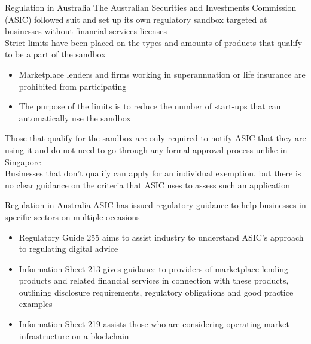\documentclass[10pt]{beamer}
\begin{document}

\begin{frame}{Regulation in Australia}
	The Australian Securities and Investments Commission (ASIC) followed suit and set up its own regulatory sandbox targeted at businesses without financial services licenses \\ \vspace{3mm}
	Strict limits have been placed on the types and amounts of products that qualify to be a part of the sandbox
	\begin{itemize}
		\item Marketplace lenders and firms working in superannuation or life insurance are prohibited from participating
		\item The purpose of the limits is to reduce the number of start-ups that can automatically use the sandbox
	\end{itemize}
	Those that qualify for the sandbox are only required to notify ASIC that they are using it and do not need to go through any formal approval process unlike in Singapore \\ \vspace{3mm}
	Businesses that don't qualify can apply for an individual exemption, but there is no clear guidance on the criteria that ASIC uses to assess such an application
\end{frame}


\begin{frame}{Regulation in Australia}
	ASIC has issued regulatory guidance to help businesses in specific sectors on multiple occasions
	\begin{itemize}
		\item Regulatory Guide 255 aims to assist industry to understand ASIC's approach to regulating digital advice
		\item Information Sheet 213 gives guidance to providers of marketplace lending products
		and related financial services in connection with these products, outlining disclosure requirements, regulatory obligations and good practice examples
		\item Information Sheet 219 assists those who are considering operating market infrastructure on a blockchain
	\end{itemize}
\end{frame}

\end{document}
